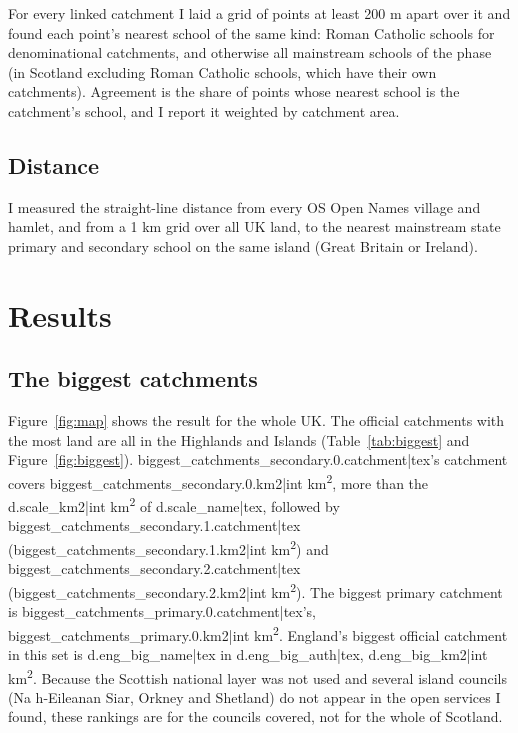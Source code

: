 \documentclass[11pt,a4paper]{article}
\begin{document}
For every linked catchment I laid a grid of points at least 200 m apart over it and found each point's nearest school of the same kind: Roman Catholic schools for denominational catchments, and otherwise all mainstream schools of the phase (in Scotland excluding Roman Catholic schools, which have their own catchments). Agreement is the share of points whose nearest school is the catchment's school, and I report it weighted by catchment area.

\subsection{Distance}

I measured the straight-line distance from every OS Open Names village and hamlet, and from a 1 km grid over all UK land, to the nearest mainstream state primary and secondary school on the same island (Great Britain or Ireland).

\section{Results}

\subsection{The biggest catchments}

Figure~\ref{fig:map} shows the result for the whole UK. The official catchments with the most land are all in the Highlands and Islands (Table~\ref{tab:biggest} and Figure~\ref{fig:biggest}). {{biggest_catchments_secondary.0.catchment|tex}}'s catchment covers {{biggest_catchments_secondary.0.km2|int}} km\textsuperscript{2}, more than the {{d.scale_km2|int}} km\textsuperscript{2} of {{d.scale_name|tex}}, followed by {{biggest_catchments_secondary.1.catchment|tex}} ({{biggest_catchments_secondary.1.km2|int}} km\textsuperscript{2}) and {{biggest_catchments_secondary.2.catchment|tex}} ({{biggest_catchments_secondary.2.km2|int}} km\textsuperscript{2}). The biggest primary catchment is {{biggest_catchments_primary.0.catchment|tex}}'s, {{biggest_catchments_primary.0.km2|int}} km\textsuperscript{2}. England's biggest official catchment in this set is {{d.eng_big_name|tex}} in {{d.eng_big_auth|tex}}, {{d.eng_big_km2|int}} km\textsuperscript{2}. Because the Scottish national layer was not used and several island councils (Na h-Eileanan Siar, Orkney and Shetland) do not appear in the open services I found, these rankings are for the councils covered, not for the whole of Scotland.
\end{document}
